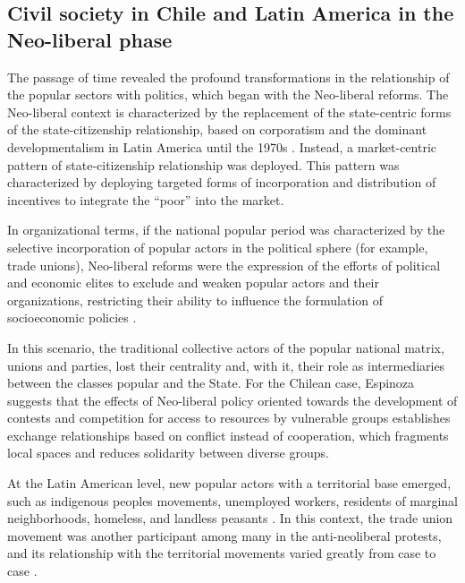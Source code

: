 \subsection{Civil society in Chile and Latin America in the Neo-liberal phase}

The passage of time revealed the profound transformations in the relationship of the popular sectors with politics, which began with the Neo-liberal reforms. The Neo-liberal context is characterized by the replacement of the state-centric forms of the state-citizenship relationship, based on corporatism and the dominant developmentalism in Latin America until the 1970s \parencite{oxhorn_neopluralism_2004, garreton_cambios_2001}. Instead, a market-centric pattern of state-citizenship relationship was deployed. This pattern was characterized by deploying targeted forms of incorporation and distribution of incentives to integrate the “poor” into the market.
\bigskip

In organizational terms, if the national popular period was characterized by the selective incorporation of popular actors in the political sphere (for example, trade unions), Neo-liberal reforms were the expression of the efforts of political and economic elites to exclude and weaken popular actors and their organizations, restricting their ability to influence the formulation of socioeconomic policies \parencite{collier_shaping_1991, cook_politics_2009, espinoza_local_2013, rossi_second_2015, silva_reshaping_2018}.
\bigskip

In this scenario, the traditional collective actors of the popular national matrix, unions and parties, lost their centrality \parencite{barozet_entre_2016,espinoza_local_2013,garreton_cambios_2001} and, with it, their role as intermediaries between the classes popular and the State. For the Chilean case, Espinoza \parencite*{espinoza_local_2013} suggests that the effects of Neo-liberal policy oriented towards the development of contests and competition for access to resources by vulnerable groups establishes exchange relationships based on conflict instead of cooperation, which fragments local spaces and reduces solidarity between diverse groups.
\bigskip

At the Latin American level, new popular actors with a territorial base emerged, such as indigenous peoples movements, unemployed workers, residents of marginal neighborhoods, homeless, and landless peasants \parencite{merklen_pobres_2010, rossi_second_2015, seoane_nuevas_2006, svampa_movimientos_2010}. In this context, the trade union movement was another participant among many in the anti-neoliberal protests, and its relationship with the territorial movements varied greatly from case to case \parencite{silva_challenging_2009}.
\bigskip

